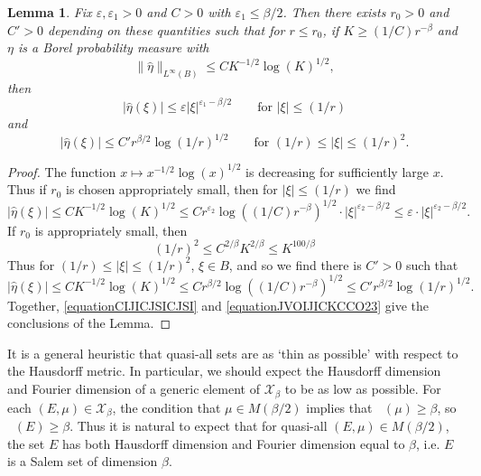 \documentclass[dvipsnames,letterpaper,12pt]{article}
\numberwithin{equation}{section}
\DeclareMathOperator{\fordim}{\dim_{\mathbf{F}}}
\newtheorem{lemma}[theorem]{Lemma}
\numberwithin{theorem}{section}
\begin{document}
\begin{lemma} \label{remarkGGIVJIS}
    Fix $\varepsilon,\varepsilon_1 > 0$ and $C > 0$ with $\varepsilon_1 \leq \beta/2$. Then there exists $r_0 > 0$ and $C' > 0$ depending on these quantities such that for $r \leq r_0$, if $K \geq (1/C) r^{-\beta}$ and $\eta$ is a Borel probability measure with
    \begin{equation}
        \| \widehat{\eta} \|_{L^\infty(B)} \leq C K^{-1/2} \log(K)^{1/2},
    \end{equation}
    then
    \[ |\widehat{\eta}(\xi)| \leq \varepsilon |\xi|^{\varepsilon_1 - \beta/2} \quad\quad \text{for $|\xi| \leq (1/r)$} \]
    and
    \[ |\widehat{\eta}(\xi)| \leq C' r^{\beta/2} \log(1/r)^{1/2} \quad\quad \text{for $(1/r) \leq |\xi| \leq (1/r)^{2}$}. \]
\end{lemma}
\begin{proof}
    The function $x \mapsto x^{-1/2} \log(x)^{1/2}$ is decreasing for sufficiently large $x$. Thus if $r_0$ is chosen appropriately small, then for $|\xi| \leq (1/r)$ we find
    \begin{equation} \label{equationCIJICJSICJSI}
        |\widehat{\eta}(\xi)| \leq C K^{-1/2} \log(K)^{1/2} \leq C r^{\varepsilon_2} \log((1/C) r^{-\beta})^{1/2} \cdot |\xi|^{\varepsilon_2 - \beta/2} \leq \varepsilon \cdot |\xi|^{\varepsilon_2 - \beta/2}.
    \end{equation}
    If $r_0$ is appropriately small, then
    \begin{equation}
        (1/r)^2 \leq C^{2/\beta} K^{2/\beta} \leq K^{100/\beta}
    \end{equation}
    Thus for $(1/r) \leq |\xi| \leq (1/r)^2$, $\xi \in B$, and so we find there is $C' > 0$ such that
    \begin{equation} \label{equationJVOIJICKCCO23}
        |\widehat{\eta}(\xi)| \leq C K^{-1/2} \log(K)^{1/2} \leq C r^{\beta/2} \log((1/C) r^{-\beta})^{1/2} \leq C' r^{\beta/2} \log(1/r)^{1/2}.
    \end{equation}
    Together, \eqref{equationCIJICJSICJSI} and \eqref{equationJVOIJICKCCO23} give the conclusions of the Lemma.
\end{proof}

It is a general heuristic that quasi-all sets are as `thin as possible' with respect to the Hausdorff metric. In particular, we should expect the Hausdorff dimension and Fourier dimension of a generic element of $\mathcal{X}_\beta$ to be as low as possible. For each $(E,\mu) \in \mathcal{X}_\beta$, the condition that $\mu \in M(\beta/2)$ implies that $\fordim(\mu) \geq \beta$, so $\fordim(E) \geq \beta$. Thus it is natural to expect that for quasi-all $(E,\mu) \in M(\beta/2)$, the set $E$ has both Hausdorff dimension and Fourier dimension equal to $\beta$, i.e. $E$ is a Salem set of dimension $\beta$.
\end{document}
